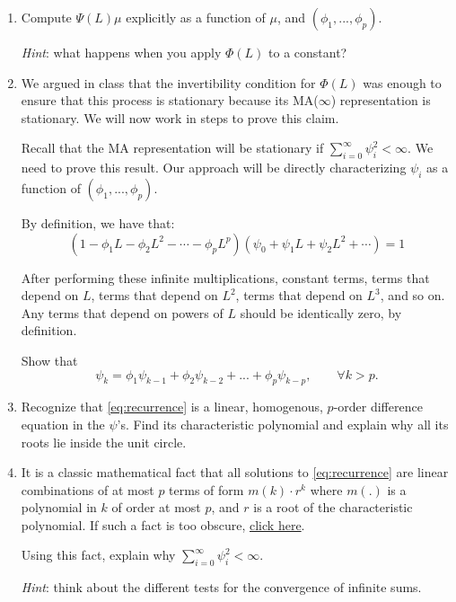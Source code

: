 \documentclass[11pt]{article}
\theoremstyle{definition}
\begin{document}
\begin{enumerate}
	\item Compute $\Psi(L)\mu$ explicitly as a function of $\mu$, and $(\phi_1, ..., \phi_p)$.
	
	\textit{Hint}: what happens when you apply $\Phi(L)$ to a constant?

	\item We argued in class that the invertibility condition for $\Phi(L)$ was enough to ensure that this process is stationary because its MA($\infty$) representation is stationary. We will now work in steps to prove this claim. 
	
	Recall that the MA representation will be stationary if $\sum\limits_{i=0}^{\infty}\psi_i^2 < \infty$. We need to prove this result. Our approach will be directly characterizing $\psi_i$ as a function of $(\phi_1, ..., \phi_p)$.

	By definition, we have that:
	\begin{equation*}
		(1 - \phi_1 L - \phi_2 L^2 - \cdots - \phi_p L^p)(\psi_0 + \psi_1 L + \psi_2 L^2 + \cdots) = 1
	\end{equation*}

	After performing these infinite multiplications, constant terms, terms that depend on $L$, terms that depend on $L^2$, terms that depend on $L^3$, and so on. Any terms that depend on powers of $L$ should be identically zero, by definition.

	Show that 
	\begin{equation}
		\label{eq:recurrence}
		\psi_k = \phi_1 \psi_{k-1} + \phi_2 \psi_{k-2} + ... + \phi_p \psi_{k-p}, \qquad \forall k > p.
	\end{equation}

	\item Recognize that \eqref{eq:recurrence} is a linear, homogenous, $p$-order difference equation in the $\psi$'s. Find its characteristic polynomial and explain why all its roots lie inside the unit circle.
	
	\item It is a classic mathematical fact that all solutions to \eqref{eq:recurrence} are linear combinations of at most $p$ terms of form $m(k)\cdot r^k$ where $m(.)$ is a polynomial in $k$ of order at most $p$, and $r$ is a root of the characteristic polynomial. If such a fact is too obscure, \href{https://wwz.unibas.ch/fileadmin/user_upload/wwz/00_Professuren/Kleiber_Oekonometrie_und_Statistik/Downloads/Topics/Skript008_DifferenceEquations.pdf}{click here}.
	
	Using this fact, explain why $\sum\limits_{i=0}^{\infty}\psi_i^2 < \infty$. 
	
	\emph{Hint}: think about the different tests for the convergence of infinite sums.
\end{enumerate}
\end{document}
